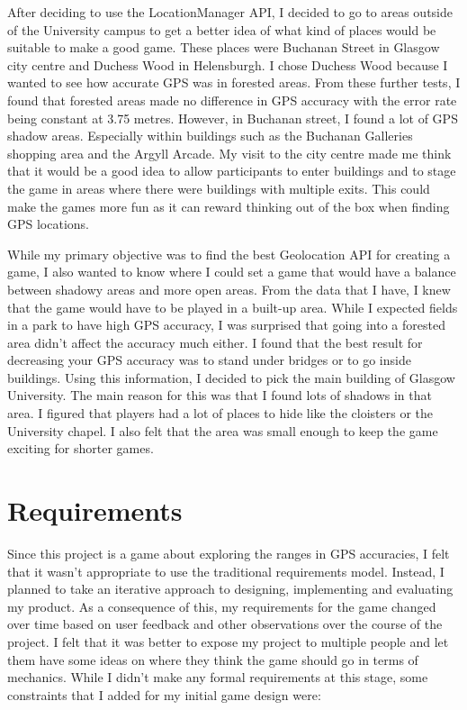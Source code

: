 \documentclass{l4proj}
\begin{document}
After deciding to use the LocationManager API, I decided to go to areas outside of the University
campus to get a better idea of what kind of places would be suitable to make a good game. These places were
Buchanan Street in Glasgow city centre and Duchess Wood in Helensburgh. I chose Duchess Wood because I wanted
to see how accurate GPS was in forested areas. From these further tests, I found that forested areas made no
difference in GPS accuracy with the error rate being constant at 3.75 metres. However, in Buchanan street, I
found a lot of GPS shadow areas. Especially within buildings such as the Buchanan Galleries shopping area
and the Argyll Arcade. My visit to the city centre made me think that it would be a good idea to allow
participants to enter buildings and to stage the game in areas where there were buildings with multiple
exits. This could make the games more fun as it can reward thinking out of the box when finding GPS locations.   

While my primary objective was to find the best Geolocation API for creating a game, I also wanted to 
know where I could set a game that would have a balance between shadowy areas and more open areas. From
the data that I have, I knew that the game would have to be played in a built-up area. While I expected
fields in a park to have high GPS accuracy, I was surprised that going into a forested area didn't affect
the accuracy much either. I found that the best result for decreasing your GPS accuracy was to stand
under bridges or to go inside buildings. Using this information, I decided to pick the main building
of Glasgow University. The main reason for this was that I found lots of shadows in that area. I figured
that players had a lot of places to hide like the cloisters or the University chapel. I also felt that
the area was small enough to keep the game exciting for shorter games.

\section{Requirements}
Since this project is a game about exploring the ranges in GPS accuracies, I felt
that it wasn't appropriate to use the traditional requirements model. Instead, I planned to take an
iterative approach to designing, implementing and evaluating my product. As a consequence of this,
my requirements for the game changed over time based on user feedback and other observations over
the course of the project. I felt that it was better to expose my project to multiple people and
let them have some ideas on where they think the game should go in terms of mechanics. While I didn't
make any formal requirements at this stage, some constraints that I added for my initial game design were:
\end{document}
